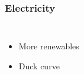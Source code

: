 \begin{frame}
\frametitle{Electricity}
\begin{columns}
	\column[t]{5cm}
	\begin{itemize}
		\item More renewables
		\item Duck curve
	\end{itemize}

\end{columns}
\end{frame}



















